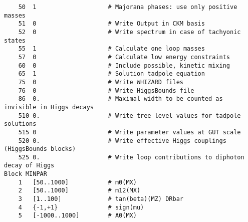 \documentclass[final,3p,11pt,pdflatex]{elsarticle}
\begin{document}
\begin{lstlisting}
    50  1                    # Majorana phases: use only positive masses
    51  0                    # Write Output in CKM basis
    52  0                    # Write spectrum in case of tachyonic states
    55  1                    # Calculate one loop masses
    57  0                    # Calculate low energy constraints
    60  0                    # Include possible, kinetic mixing
    65  1                    # Solution tadpole equation
    75  0                    # Write WHIZARD files
    76  0                    # Write HiggsBounds file
    86  0.                   # Maximal width to be counted as invisible in Higgs decays
    510 0.                   # Write tree level values for tadpole solutions
    515 0                    # Write parameter values at GUT scale
    520 0.                   # Write effective Higgs couplings (HiggsBounds blocks)
    525 0.                   # Write loop contributions to diphoton decay of Higgs
Block MINPAR
    1   [50..1000]           # m0(MX)
    2   [50..1000]           # m12(MX)
    3   [1..100]             # tan(beta)(MZ) DRbar
    4   {-1,+1}              # sign(mu)
    5   [-1000..1000]        # A0(MX)
\end{lstlisting}

\clearpage
\end{document}
